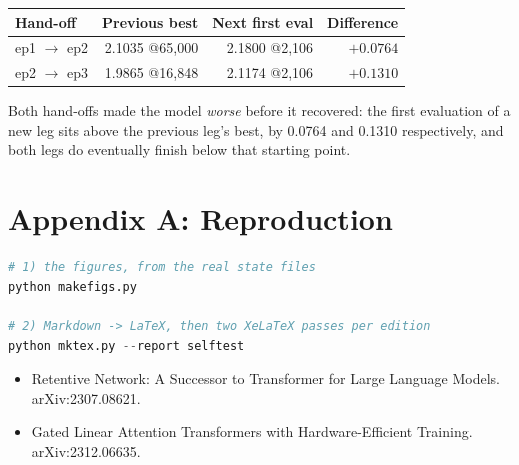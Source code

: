 \begin{center}\small
\begin{tabular}{@{}lrrr@{}}
\toprule
\textbf{Hand-off} & \textbf{Previous best} & \textbf{Next first eval} & \textbf{Difference} \\
\midrule
ep1 $\rightarrow$ ep2 & 2.1035 @65{,}000 & 2.1800 @2{,}106 & $+0.0764$ \\
ep2 $\rightarrow$ ep3 & 1.9865 @16{,}848 & 2.1174 @2{,}106 & $+0.1310$ \\
\bottomrule
\end{tabular}
\end{center}

Both hand-offs made the model \emph{worse} before it recovered: the first evaluation of a new
leg sits above the previous leg's best, by 0.0764 and 0.1310 respectively, and both legs do
eventually finish below that starting point.

\section{Appendix A: Reproduction}

\begin{lstlisting}[language=Python]
# 1) the figures, from the real state files
python makefigs.py

# 2) Markdown -> LaTeX, then two XeLaTeX passes per edition
python mktex.py --report selftest
\end{lstlisting}


\begin{itemize}
  \item Retentive Network: A Successor to Transformer for Large Language Models. arXiv:2307.08621.
  \item Gated Linear Attention Transformers with Hardware-Efficient Training. arXiv:2312.06635.
\end{itemize}

